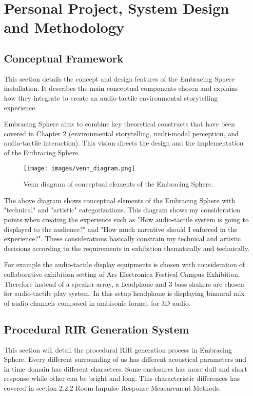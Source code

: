 \chapter{Personal Project, System Design and Methodology}
    \section{Conceptual Framework}
        This section details the concept and design features of the Embracing Sphere installation. It describes the main conceptual components chosen and explains how they integrate to create an audio-tactile environmental storytelling experience.\par

        Embracing Sphere aims to combine key theoretical constructs that have been covered in Chapter 2 (environmental storytelling, multi-modal perception, and audio-tactile interaction). This vision directs the design and the implementation of the Embracing Sphere.\par

        \begin{figure}[H]
            \centering
            \texttt{[image: images/venn\_diagram.png]}
            \caption{Venn diagram of conceptual elements of the Embracing Sphere.}
            \label{fig:VENN}
        \end{figure}        

        The above diagram shows conceptual elements of the Embracing Sphere with "technical" and "artistic" categorizations. This diagram shows my consideration points when creating the experience such as "How audio-tactile system is going to displayed to the audience?" and "How much narrative should I enforced in the experience?". These considerations basically constrain my technical and artistic decisions according to the requirements in exhibition thematically and technically.\par

        For example the audio-tactile display equipments is chosen with consideration of collaborative exhibition setting of Ars Electronica Festival Campus Exhibition. Therefore instead of a speaker array, a headphone and 3 bass shakers are chosen for audio-tactile play system. In this setup headphone is displaying binaural mix of audio channels composed in ambisonic format for 3D audio.\par
    \section{Procedural RIR Generation System}
        This section will detail the procedural RIR generation process in Embracing Sphere. Every different surrounding of us has different acoustical parameters and in time domain has different characters. Some enclosures has more dull and short response while other can be bright and long. This characteristic differences has covered in section 2.2.2 Room Impulse Response Measurement Methods.\par


